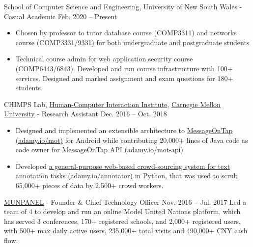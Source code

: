 \documentclass[hidelinks__VERSION__]{adamyi-cv}
\begin{document}
\begin{entrylist}


\entry
{School of Computer Science and Engineering, University of New South Wales - Casual Academic}
{Feb. 2020 -- Present}
{
\begin{minipage}[t]{1\linewidth}
\begin{itemize}[leftmargin=*,align=left,noitemsep]
\item Chosen by professor to tutor database course (COMP3311) and networks course (COMP3331/9331) for both undergraduate and postgraduate students
\item Technical course admin for web application security course (COMP6443/6843). Developed and run course infrastructure with 100+ services. Designed and marked assignment and exam questions for 180+ students.
\end{itemize}
\end{minipage}
}


\entry
{CHIMPS Lab, \href{https://www.hcii.cmu.edu/}{Human-Computer Interaction Institute}, \href{https://www.cmu.edu/}{Carnegie Mellon University} - Research Assistant}
{Dec. 2016 -- Oct. 2018}
{
\begin{minipage}[t]{1\linewidth}
\begin{itemize}[leftmargin=*,align=left,noitemsep]
\item Designed and implemented an extensible architecture to \href{https://adamy.io/mot}{MessageOnTap (adamy.io/mot)} for Android while contributing 20,000+ lines of Java code as code owner for \href{https://adamy.io/mot-api}{MessageOnTap API (adamy.io/mot-api)}
\item Developed \href{https://adamy.io/annotator}{a general-purpose web-based crowd-sourcing system for text annotation tasks (adamy.io/annotator)} in Python, that was used to scrub 65,000+ pieces of data by 2,500+ crowd workers.
\end{itemize}
\end{minipage}
}


\entry
{\href{https://www.munpanel.com}{MUNPANEL} - Founder \& Chief Technology Officer}
{Nov. 2016 -- Jul. 2017}
{Led a team of 4 to develop and run an online Model United Nations platform, which has served 3 conferences, 170+ registered schools, and 2,000+ registered users, with 500+ max daily active users, 235,000+ total visits and 490,000+ CNY cash flow.}

\end{entrylist}
\end{document}
